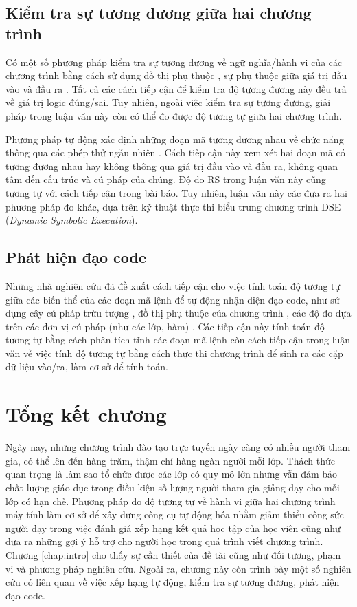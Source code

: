 \subsection*{Kiểm tra sự tương đương giữa hai chương trình}

Có một số phương pháp kiểm tra sự tương đương về ngữ nghĩa/hành vi của
các chương trình bằng cách sử dụng đồ thị phụ thuộc
\cite{bates1993incremental,binkley1992using}, sự phụ thuộc giữa giá
trị đầu vào và đầu ra \cite{jackson1994semantic}. Tất cả các cách tiếp
cận để kiểm tra độ tương đương này đều trả về giá trị logic
đúng/sai. Tuy nhiên, ngoài việc kiểm tra sự tương đương, giải pháp
trong luận văn này còn có thể đo được độ tương tự giữa hai chương
trình.

Phương pháp tự động xác định những đoạn mã tương đương nhau về chức
năng thông qua các phép thử ngẫu nhiên
\cite{jiang2009automatic}. Cách tiếp cận này xem xét hai đoạn mã có
tương đương nhau hay không thông qua giá trị đầu vào và đầu ra, không
quan tâm đến cấu trúc và cú pháp của chúng. Độ đo RS trong luận văn này 
cũng tương tự với cách tiếp cận trong bài báo. Tuy nhiên, luận văn này 
các đưa ra hai phương pháp đo khác, dựa trên kỹ thuật thực thi biểu 
trưng chương trình DSE (\emph{Dynamic Symbolic Execution}).
		
\subsection*{Phát hiện đạo code}

Những nhà nghiên cứu đã đề xuất cách tiếp cận cho việc tính toán
độ tương tự giữa các biến thể của các đoạn mã lệnh để tự động nhận
diện đạo code, như sử dụng cây cú pháp trừu tượng
\cite{baxter1998clone}, đồ thị phụ thuộc của chương trình
\cite{komondoor2001using}, các độ đo dựa trên các đơn vị cú pháp (như
các lớp, hàm) \cite{dang2012xiao} \cite{merlo2004linear}. Các tiếp cận
này tính toán độ tương tự bằng cách phân tích tĩnh các đoạn mã lệnh
còn cách tiếp cận trong luận văn về việc tính độ tương tự bằng cách
thực thi chương trình để sinh ra các cặp dữ liệu vào/ra, làm cơ sở để
tính toán.
	
\section*{Tổng kết chương}

Ngày nay, những chương trình đào tạo trực tuyến ngày càng có nhiều
người tham gia, có thể lên đến hàng trăm, thậm chí hàng ngàn người mỗi
lớp. Thách thức quan trọng là làm sao tổ chức được các lớp có quy mô
lớn nhưng vẫn đảm bảo chất lượng giáo dục trong điều kiện số lượng
người tham gia giảng dạy cho mỗi lớp có hạn chế. Phương pháp đo độ
tương tự về hành vi giữa hai chương trình máy tính làm cơ sở để xây
dựng công cụ tự động hóa nhằm giảm thiểu công sức người dạy trong việc
đánh giá xếp hạng kết quả học tập của học viên cũng như đưa ra những
gợi ý hỗ trợ cho người học trong quá trình viết chương trình.
Chương \ref{chap:intro} cho thấy sự cần thiết của đề tài cũng như đối 
tượng, phạm vi và phương pháp nghiên cứu. Ngoài ra, chương này còn trình 
bày một số nghiên cứu có liên quan về việc xếp hạng tự động, kiểm tra sự 
tương đương, phát hiện đạo code.

